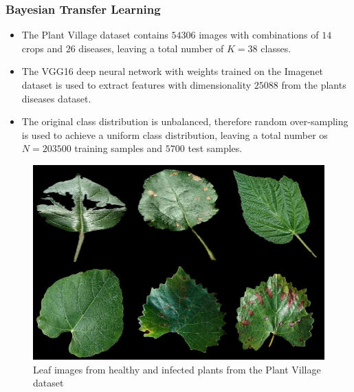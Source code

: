 \documentclass[10pt,a4paper]{beamer}
\begin{document}
\begin{frame}\frametitle{Bayesian Transfer Learning}
\begin{itemize}
	\item The Plant Village dataset contains $54306$ images with combinations of $14$ crops and $26$ diseases, leaving a total number of $K=38$ classes.
	\item  The VGG16 deep neural network with weights trained on the Imagenet dataset is used to extract features with dimensionality $25088$ from the plants diseases dataset. 
	\item The original class distribution is unbalanced, therefore random over-sampling is used to achieve a uniform class distribution, leaving a total number os $N=203500$ training samples and $5700$ test samples.
	\end{itemize}


\begin{figure}
	\includegraphics[width=\hsize]{figures/plant_village_subset}
	\caption{Leaf images from healthy and infected plants from the Plant Village dataset}
	\label{fig:plantvillagesubset}
\end{figure}
\end{frame}
\end{document}
